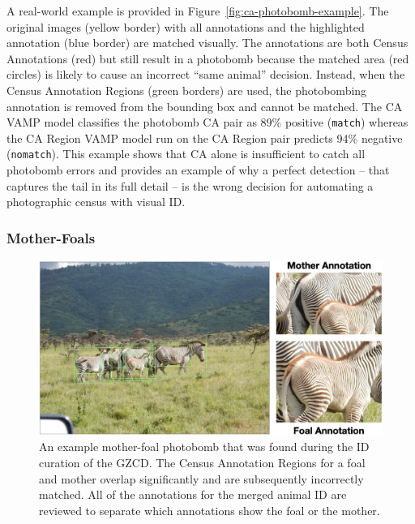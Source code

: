 A real-world example is provided in Figure~\ref{fig:ca-photobomb-example}.  The original images (yellow border) with all annotations and the highlighted annotation (blue border) are matched visually.  The annotations are both Census Annotations (red) but still result in a photobomb because the matched area (red circles) is likely to cause an incorrect ``same animal'' decision.  Instead, when the Census Annotation Regions (green borders) are used, the photobombing annotation is removed from the bounding box and cannot be matched.  The CA VAMP model classifies the photobomb CA pair as 89\% positive (\texttt{match}) whereas the CA Region VAMP model run on the CA Region pair predicts 94\% negative (\texttt{nomatch}).  This example shows that CA alone is insufficient to catch all photobomb errors and provides an example of why a perfect detection -- that captures the tail in its full detail -- is the wrong decision for automating a photographic census with visual ID.

\subsubsection{Mother-Foals}

\begin{figure}[!t]
    \begin{center}
        \includegraphics[width=0.9\linewidth]{resources/mother-foal-1.pdf}
    \end{center}
    \caption{An example mother-foal photobomb that was found during the ID curation of the GZCD.  The Census Annotation Regions for a foal and mother overlap significantly and are subsequently incorrectly matched.  All of the annotations for the merged animal ID are reviewed to separate which annotations show the foal or the mother.}
    \label{fig:mother-foal-photobomb-example}
\end{figure}

